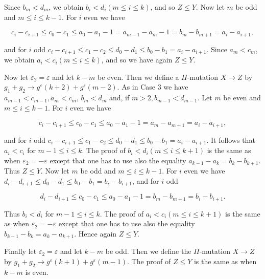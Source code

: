 \documentclass[10pt]{article}
\begin{document}
Since $b_{m}<d_{m}$, we obtain $b_{i}<d_{i}(m \leqslant i \leqslant k)$, and so $Z \leqslant Y$. Now let $m$ be odd and $m \leqslant i \leqslant k-1$. For $i$ even we have

$$
c_{i}-c_{i+1} \leqslant c_{0}-c_{1} \leqslant a_{0}-a_{1}-1=a_{m-1}-a_{m}-1=b_{m}-b_{m+1}=a_{i}-a_{i+1},
$$

and for $i$ odd $c_{i}-c_{i+1} \leqslant c_{1}-c_{2} \leqslant d_{0}-d_{1} \leqslant b_{0}-b_{1}=a_{i}-a_{i+1}$. Since $a_{m}<c_{m}$, we obtain $a_{i}<c_{i}(m \leqslant i \leqslant k)$, and so we have again $Z \leqslant Y$.

Now let $\varepsilon_{2}=\varepsilon$ and let $k-m$ be even. Then we define a $\Pi$-mutation $X \rightarrow Z$ by $g_{1}+g_{2} \rightarrow g^{\varepsilon}(k+2)+g^{\varepsilon}(m-2)$. As in Case 3 we have $a_{m-1}<c_{m-1}, a_{m}<c_{m}$, $b_{m}<d_{m}$ and, if $m>2, b_{m-1}<d_{m-1}$. Let $m$ be even and $m \leqslant i \leqslant k-1$. For $i$ even we have

$$
c_{i}-c_{i+1} \leqslant c_{0}-c_{1} \leqslant a_{0}-a_{1}-1=a_{m}-a_{m+1}=a_{i}-a_{i+1},
$$

and for $i$ odd $c_{i}-c_{i+1} \leqslant c_{1}-c_{2} \leqslant d_{0}-d_{1} \leqslant b_{0}-b_{1}=a_{i}-a_{i+1}$. It follows that $a_{i}<c_{i}$ for $m-1 \leqslant i \leqslant k$. The proof of $b_{i}<d_{i}(m \leqslant i \leqslant k+1)$ is the same as when $\varepsilon_{2}=-\varepsilon$ except that one has to use also the equality $a_{k-1}-a_{k}=b_{k}-b_{k+1}$. Thus $Z \leqslant Y$. Now let $m$ be odd and $m \leqslant i \leqslant k-1$. For $i$ even we have $d_{i}-d_{i+1} \leqslant d_{0}-d_{1} \leqslant b_{0}-b_{1}=b_{i}-b_{i+1}$, and for $i$ odd

$$
d_{i}-d_{i+1} \leqslant c_{0}-c_{1} \leqslant a_{0}-a_{1}-1=b_{m}-b_{m+1}=b_{i}-b_{i+1} .
$$

Thus $b_{i}<d_{i}$ for $m-1 \leqslant i \leqslant k$. The proof of $a_{i}<c_{i}(m \leqslant i \leqslant k+1)$ is the same as when $\varepsilon_{2}=-\varepsilon$ except that one has to use also the equality $b_{k-1}-b_{k}=a_{k}-a_{k+1}$. Hence again $Z \leqslant Y$.

Finally let $\varepsilon_{2}=\varepsilon$ and let $k-m$ be odd. Then we define the $\Pi$-mutation $X \rightarrow Z$ by $g_{1}+g_{2} \rightarrow g^{\varepsilon}(k+1)+g^{\varepsilon}(m-1)$. The proof of $Z \leqslant Y$ is the same as when $k-m$ is even.
\end{document}
